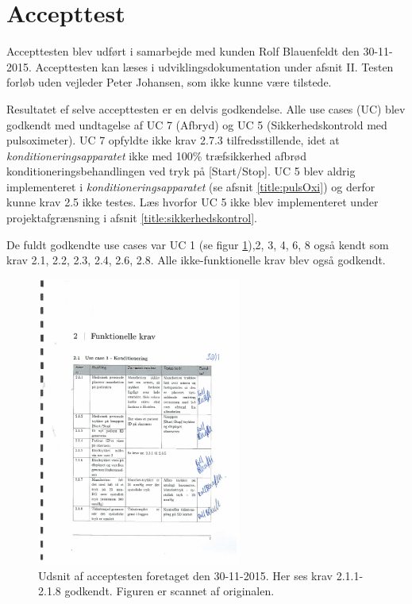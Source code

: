 \section{Accepttest} \label{title:accepttest1}
Accepttesten blev udført i samarbejde med kunden Rolf Blauenfeldt den 30-11-2015. Accepttesten kan læses i udviklingsdokumentation under afsnit II. Testen forløb uden vejleder Peter Johansen, som ikke kunne være tilstede.

Resultatet ef selve accepttesten er en delvis godkendelse. Alle use cases (UC) blev godkendt med undtagelse af UC 7 (Afbryd) og UC 5 (Sikkerhedskontrold med pulsoximeter). UC 7 opfyldte ikke krav 2.7.3 tilfredsstillende, idet at \textit{konditioneringsapparatet} ikke med 100\% træfsikkerhed afbrød konditioneringsbehandlingen ved tryk på [Start/Stop]. UC 5 blev aldrig implementeret i \textit{konditioneringsapparatet} (se afsnit \ref{title:pulsOxi}) og derfor kunne krav 2.5 ikke testes. Læs hvorfor UC 5 ikke blev implementeret under projektafgrænsning i afsnit \ref{title:sikkerhedskontrol}.

De fuldt godkendte use cases var UC 1 (se figur \ref{fig:udsnitAfAccepttest}),2, 3, 4, 6, 8 også kendt som krav 2.1, 2.2, 2.3, 2.4, 2.6, 2.8. Alle ikke-funktionelle krav blev også godkendt. 

\begin{figure}[H]
	\centering
	\includegraphics[width=0.6\textwidth]{billeder/udsnitAfAccepttest.pdf}
	\caption{Udsnit af acceptesten foretaget den 30-11-2015. Her ses krav 2.1.1-2.1.8 godkendt. Figuren er scannet af originalen.}\label{fig:udsnitAfAccepttest}
\end{figure}